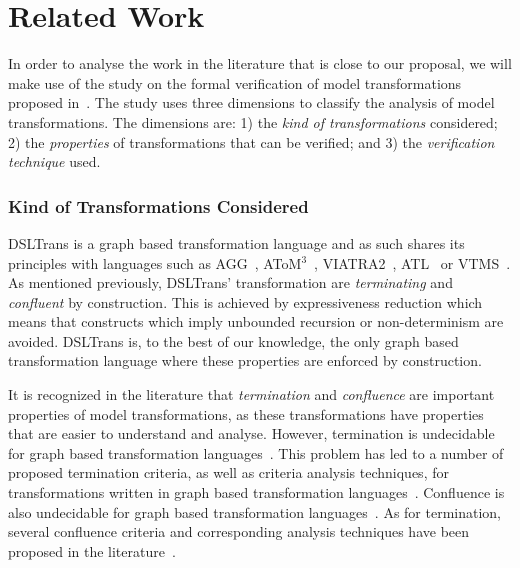 \section{Related Work}
\label{sec:related_work}


In order to analyse the work in the literature that is close to our proposal, we will make use of the study on the formal verification of model transformations proposed in~\cite{DBLP:conf/icst/AmraniLSCDVTC12}. The study uses three dimensions to classify the analysis of model transformations. The dimensions are: 1) the \emph{kind of transformations} considered; 2) the \emph{properties} of transformations that can be verified; and 3) the \emph{verification technique} used.

\subsubsection*{Kind of Transformations Considered} DSLTrans is a graph based transformation language and as such shares its principles with languages such as AGG~\cite{Taentzer2000}, AToM$^3$~\cite{atom3:2002}, VIATRA2~\cite{DBLP:conf/uml/VarroP04}, ATL~\cite{Jouault200831} or VTMS~\cite{DBLP:journals/entcs/LevendovszkyLMC05}. As mentioned previously, DSLTrans' transformation are \emph{terminating} and \emph{confluent} by construction. This is achieved by expressiveness reduction which means that constructs which imply unbounded recursion or non-determinism are avoided. DSLTrans is, to the best of our knowledge, the only graph based transformation language where these properties are enforced by construction.

It is recognized in the literature that \emph{termination} and \emph{confluence} are important properties of model transformations, as these transformations have properties that are easier to understand and analyse. However, termination is undecidable for graph based transformation languages~\cite{DBLP:journals/fuin/Plump98}. This problem has led to a number of proposed termination criteria, as well as criteria analysis techniques, for transformations written in graph based transformation languages~\cite{deLara:2010:ATA:1815798.1815800,EhrigEhrigTaentzerdeLaraVarroVarro2005,Varro-Varro-etAl-2006,J:Bruggink2008,J:Kuster2006}. Confluence is also undecidable for graph based transformation languages~\cite{Plump2005}. As for termination, several confluence criteria and corresponding analysis techniques have been proposed in the literature~\cite{HeckelKT02,J:Kuster2006,J:Lambers-etAl-2006,J:Biermann2011}.


